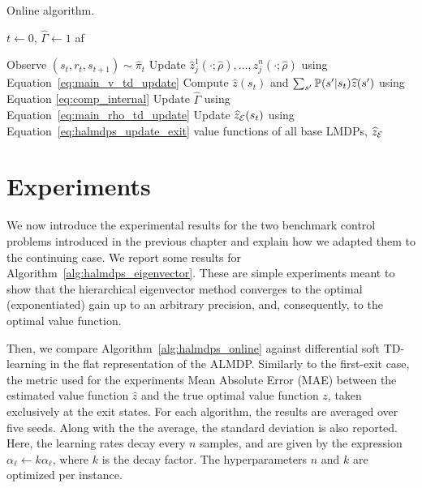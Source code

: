 \begin{algorithm}[!htpb]
  \caption{Online algorithm.}
  \begin{algorithmic}[1]
    \State $t \gets 0$, $\widehat{\Gamma} \gets 1$
    \State af

    \State Observe $(s_{t}, r_{t}, s_{t+1})\sim\widehat\pi_t$
    \State Update $\widehat z_j^1(\cdot;\widehat\rho),\ldots,\widehat z_j^n(\cdot;\widehat\rho)$ using Equation~\eqref{eq:main_v_td_update}
    \State Compute $\widehat z(s_t)$ and $\sum_{s'}\mathbb{P}(s'|s_t)\widehat z(s')$ using Equation \eqref{eq:comp_internal}
    \State Update $\widehat\Gamma$ using Equation~\eqref{eq:main_rho_td_update}
    \State Update $\widehat z_{\mathcal{E}}(s_t)$ using Equation~\eqref{eq:halmdps_update_exit}
    \EndIf
    \EndWhile
    \State \Return value functions of all base LMDPs, ${\widehat z_{\mathcal{E}}}$

  \end{algorithmic}
  \label{alg:halmdps_online}
\end{algorithm}

\section{Experiments}

We now introduce the experimental results for the two benchmark control problems introduced in the previous chapter and explain how we adapted them to the continuing case. We report some results for Algorithm~\ref{alg:halmdps_eigenvector}. These are  simple experiments meant to show that the hierarchical eigenvector method converges to the optimal (exponentiated) gain up to an arbitrary precision, and, consequently, to the optimal value function.

Then, we compare Algorithm~\ref{alg:halmdps_online} against differential soft TD-learning in the flat representation of the ALMDP. Similarly to the first-exit case, the metric used for the experiments Mean Absolute Error (MAE) between the estimated value function $\widehat z$ and the true optimal value function $z$, taken exclusively at the exit states. For each algorithm, the results are averaged over five seeds. Along with the the average, the standard deviation is also reported. Here, the learning rates decay every $n$ samples, and are given by the expression $\alpha_\ell \leftarrow k \alpha_\ell$, where $k$ is the decay factor. The hyperparameters $n$ and $k$ are optimized per instance.

